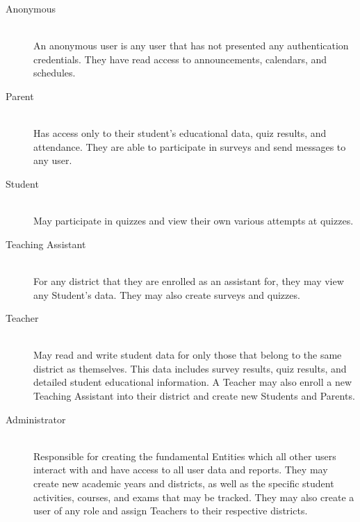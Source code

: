 \begin{description}
	\item [Anonymous] \hfill \\ An anonymous user is any user that has not presented any authentication credentials. They have read access to announcements, calendars, and schedules.
	\item [Parent] \hfill \\ Has access only to their student's educational data, quiz results, and attendance. They are able to participate in surveys and send messages to any user.
	\item [Student] \hfill \\ May participate in quizzes and view their own various attempts at quizzes.
	\item [Teaching Assistant] \hfill \\ For any district that they are enrolled as an assistant for, they may view any Student's data. They may also create surveys and quizzes.
	\item [Teacher] \hfill \\ May read and write student data for only those that belong to the same district as themselves. This data includes survey results, quiz results, and detailed student educational information. A Teacher may also enroll a new Teaching Assistant into their district and  create new Students and Parents.
	\item [Administrator] \hfill \\ Responsible for creating the fundamental Entities which all other users interact with and have access to all user data and reports. They may create new academic years and districts, as well as the specific student activities, courses, and exams that may be tracked. They may also create a user of any role and assign Teachers to their respective districts.
\end{description}